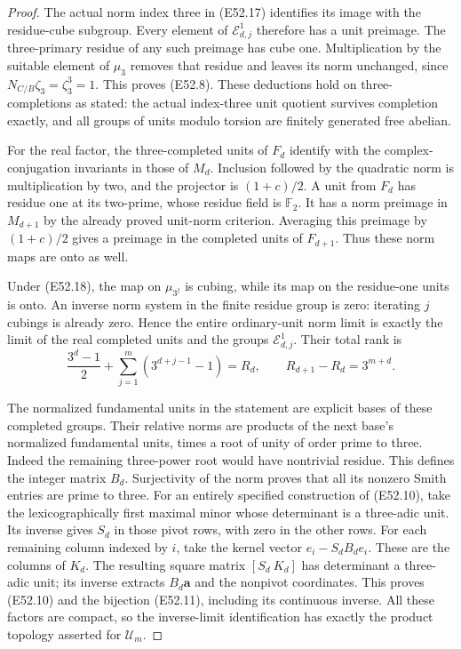 \begin{proof}
The actual norm index three
in (E52.17) identifies its
image with the residue-cube
subgroup. Every element
of $\mathcal E_{d,j}^1$
therefore has a unit preimage.
The three-primary residue
of any such preimage has
cube one. Multiplication
by the suitable element
of $\mu_3$ removes that
residue and leaves its
norm unchanged, since
$N_{C/B}\zeta_3=\zeta_3^3=1$.
This proves (E52.8).
These deductions hold on
three-completions as stated:
the actual index-three
unit quotient survives
completion exactly, and
all groups of units modulo
torsion are finitely
generated free abelian.

For the real factor,
the three-completed units
of $F_d$ identify with the
complex-conjugation invariants
in those of $M_d$.
Inclusion followed by
the quadratic norm is
multiplication by two,
and the projector is
$(1+c)/2$.
A unit from $F_d$ has
residue one at its
two-prime, whose residue
field is $\mathbb F_2$.
It has a norm preimage
in $M_{d+1}$ by the
already proved unit-norm
criterion. Averaging this
preimage by $(1+c)/2$
gives a preimage in the
completed units of
$F_{d+1}$. Thus these
norm maps are onto
as well.

Under (E52.18), the
map on $\mu_{3^j}$
is cubing, while its
map on the residue-one
units is onto.
An inverse norm system
in the finite residue
group is zero: iterating
$j$ cubings is already
zero. Hence the entire
ordinary-unit norm
limit is exactly the
limit of the real
completed units and
the groups
$\mathcal E_{d,j}^1$.
Their total rank is
\[
 \frac{3^d-1}{2}
      +\sum_{j=1}^m(3^{d+j-1}-1)
       =R_d,\qquad
 R_{d+1}-R_d=3^{m+d}.
 \tag{E52.19}
\]

The normalized fundamental
units in the statement
are explicit bases of
these completed groups.
Their relative norms
are products of the
next base's normalized
fundamental units,
times a root of unity
of order prime to three.
Indeed the remaining
three-power root would
have nontrivial residue.
This defines the
integer matrix $B_d$.
Surjectivity of the
norm proves that all
its nonzero Smith
entries are prime to
three.
For an entirely
specified construction
of (E52.10), take the
lexicographically first
maximal minor whose
determinant is a
three-adic unit.
Its inverse gives
$S_d$ in those pivot
rows, with zero in
the other rows.
For each remaining
column indexed by
$i$, take the kernel
vector $e_i-S_dB_de_i$.
These are the columns
of $K_d$.
The resulting square
matrix $[S_d\ K_d]$
has determinant a
three-adic unit;
its inverse extracts
$B_d\boldsymbol a$
and the nonpivot
coordinates.
This proves (E52.10)
and the bijection
(E52.11), including
its continuous inverse.
All these factors
are compact, so the
inverse-limit
identification has
exactly the product
topology asserted
for $\mathcal U_m$.


\end{proof}
